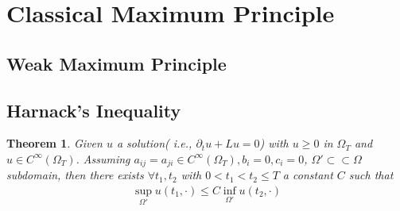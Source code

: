 \documentclass[a4paper,11pt,oneside,fleqn]{book}
\newtheorem{theorem}{Theorem}[section]
\theoremstyle{definition}
\theoremstyle{remark}
\begin{document}
\section{Classical Maximum Principle}
\subsection{Weak Maximum Principle}

\subsection{Harnack's Inequality}
\begin{theorem}
	Given $u$ a solution( i.e., $\partial_t u + Lu = 0$) with $u \ge 0$ in $\Omega_T$ and $u \in C^\infty(\Omega_T)$. Assuming $a_{ij} = a_{ji} \in C^\infty(\Omega_T), b_i = 0, c_i = 0$, $\Omega' \subset \subset \Omega$ subdomain,  then there exists $\forall t_1, t_2$ with  $0 < t_1 < t_2 \le T$ a constant $C$ such that
	\begin{align*}
		\sup_{\Omega'} u(t_1, \cdot) \le C \inf_{\Omega'} u(t_2, \cdot)
	\end{align*}
\end{theorem}
\end{document}
